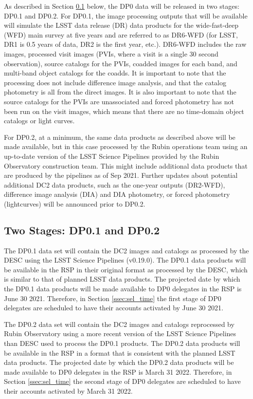 \documentclass[DM,lsstdraft,authoryear,toc]{lsstdoc}
\begin{document}
As described in Section \ref{ssec:intro_stages} below, the DP0 data will be released in two stages: DP0.1 and DP0.2.
For DP0.1, the image processing outputs that will be available will simulate the LSST data release (DR) data products for the wide-fast-deep (WFD) main survey at five years and are referred to as DR6-WFD (for LSST, DR1 is 0.5 years of data, DR2 is the first year, etc.).
DR6-WFD includes the raw images, processed visit images (PVIs, where a visit is a single 30 second observation), source catalogs for the PVIs, coadded images for each band, and multi-band object catalogs for the coadds.
It is important to note that the processing does not include difference image analysis, and that the catalog photometry is all from the direct images.
It is also important to note that the source catalogs for the PVIs are unassociated and forced photometry has not been run on the visit images, which means that there are no time-domain object catalogs or light curves.

For DP0.2, at a minimum, the same data products as described above will be made available, but in this case processed by the Rubin operations team using an up-to-date version of the LSST Science Pipelines provided by the Rubin Observatory construction team.
This might include additional data products that are produced by the pipelines as of Sep 2021.
Further updates about potential additional DC2 data products, such as the one-year outputs (DR2-WFD), difference image analysis (DIA) and DIA photometry, or forced photometry (lightcurves) will be announced prior to DP0.2.

\subsection{Two Stages: DP0.1 and DP0.2}\label{ssec:intro_stages}

The DP0.1 data set will contain the DC2 images and catalogs as processed by the DESC using the LSST Science Pipelines (v0.19.0).
The DP0.1 data products will be available in the RSP in their original format as processed by the DESC, which is similar to that of planned LSST data products.
The projected date by which the DP0.1 data products will be made available to DP0 delegates in the RSP is June 30 2021.
Therefore, in Section \ref{ssec:sel_time} the first stage of DP0 delegates are scheduled to have their accounts activated by June 30 2021.

The DP0.2 data set will contain the DC2 images and catalogs reprocessed by Rubin Observatory using a more recent version of the LSST Science Pipelines than DESC used to process the DP0.1 products.
The DP0.2 data products will be available in the RSP in a format that is consistent with the planned LSST data products.
The projected date by which the DP0.2 data products will be made available to DP0 delegates in the RSP is March 31 2022. 
Therefore, in Section \ref{ssec:sel_time} the second stage of DP0 delegates are scheduled to have their accounts activated by March 31 2022.
\end{document}
